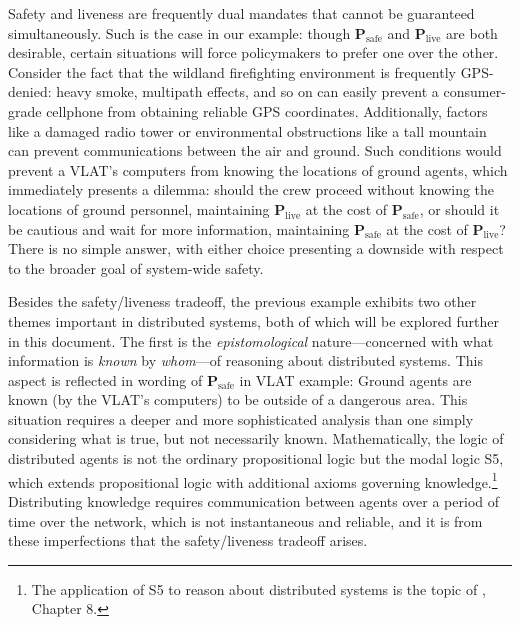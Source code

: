 \documentclass[]             %
{NASA}                       %
\theoremstyle{definition}
\begin{document}
Safety and liveness are frequently dual mandates that cannot be
guaranteed simultaneously. Such is the case in our example: though
$\textbf{P}_\textrm{safe}$ and $\textbf{P}_\textrm{live}$ are both
desirable, certain situations will force policymakers to prefer one
over the other. Consider the fact that the wildland firefighting
environment is frequently GPS-denied: heavy smoke, multipath effects,
and so on can easily prevent a consumer-grade cellphone from obtaining
reliable GPS coordinates. Additionally, factors like a damaged radio
tower or environmental obstructions like a tall mountain can prevent
communications between the air and ground. Such conditions would
prevent a VLAT's computers from knowing the locations of ground
agents, which immediately presents a dilemma: should the crew proceed
without knowing the locations of ground personnel, maintaining
$\textbf{P}_\textrm{live}$ at the cost of $\textbf{P}_\textrm{safe}$,
or should it be cautious and wait for more information, maintaining
$\textbf{P}_\textrm{safe}$ at the cost of $\textbf{P}_\textrm{live}$?
There is no simple answer, with either choice presenting a downside
with respect to the broader goal of system-wide safety.

Besides the safety/liveness tradeoff, the previous example exhibits
two other themes important in distributed systems, both of which will
be explored further in this document. The first is the
\emph{epistomological} nature---concerned with what information is
\emph{known} by \emph{whom}---of reasoning about distributed
systems. This aspect is reflected in wording of
$\textbf{P}_\textrm{safe}$ in VLAT example: Ground agents are known
(by the VLAT's computers) to be outside of a dangerous area. This
situation requires a deeper and more sophisticated analysis than one
simply considering what is true, but not necessarily
known. Mathematically, the logic of distributed agents is not the
ordinary propositional logic but the modal logic S5, which extends
propositional logic with additional axioms governing
knowledge.\footnote{The application of S5 to reason about distributed
  systems is the topic of \cite{kshemkalyani_singhal_2008}, Chapter
  8.} Distributing knowledge requires communication between agents
over a period of time over the network, which is not instantaneous and
reliable, and it is from these imperfections that the safety/liveness
tradeoff arises.
\end{document}
